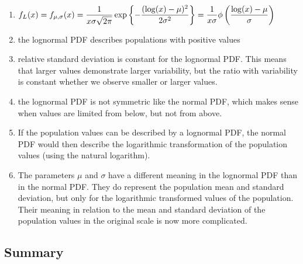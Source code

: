 \begin{enumerate}
    \item[] $
        f_L(x)
        = f_{\mu, \sigma}(x)
        = \dfrac{1}{x\sigma \sqrt{2\pi}} \exp\left\{
            -\dfrac{(\log(x) - \mu)^2}{2\sigma^2}
        \right\}
        = \dfrac{1}{x\sigma} \phi\left(\dfrac{\log(x) - \mu}{\sigma}\right)
    $
    \hfill \cite{statistics/book/Statistics-for-Data-Scientists/Maurits-Kaptein}

    \item the lognormal PDF describes populations with positive values
    \hfill \cite{statistics/book/Statistics-for-Data-Scientists/Maurits-Kaptein}

    \item relative standard deviation  is constant for the lognormal PDF.
    This means that larger values demonstrate larger variability, but the ratio with variability is constant whether we observe smaller or larger values.
    \hfill \cite{statistics/book/Statistics-for-Data-Scientists/Maurits-Kaptein}

    \item the lognormal PDF is not symmetric like the normal PDF, which makes sense when values are limited from below, but not from above.
    \hfill \cite{statistics/book/Statistics-for-Data-Scientists/Maurits-Kaptein}

    \item  If the population values can be described by a lognormal PDF, the normal PDF would then describe the logarithmic transformation of the population values (using the natural logarithm).
    \hfill \cite{statistics/book/Statistics-for-Data-Scientists/Maurits-Kaptein}

    \item The parameters $\mu$ and $\sigma$ have a different meaning in the lognormal PDF than in the normal PDF.
    They do represent the population mean and standard deviation, but only for the logarithmic transformed values of the population.
    Their meaning in relation to the mean and standard deviation of the population values in the original scale is now more complicated.
    \hfill \cite{statistics/book/Statistics-for-Data-Scientists/Maurits-Kaptein}
\end{enumerate}






\subsection{Summary}

